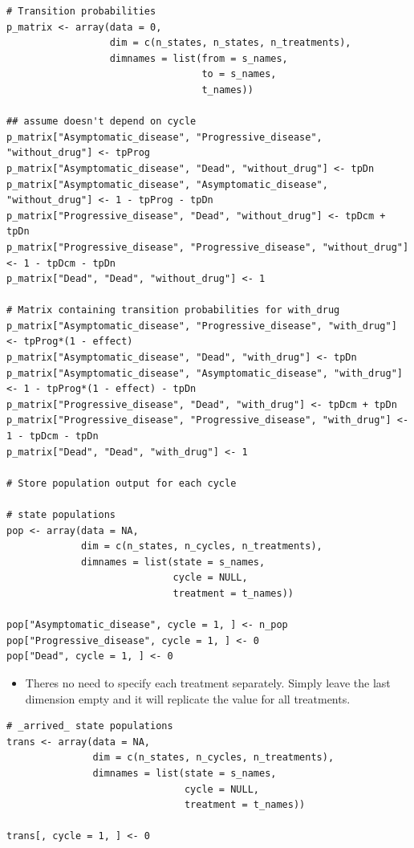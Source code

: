 \documentclass[a4paper,twoside,openany]{../svmonoBUGS}\usepackage[]{graphicx}\usepackage[]{color}
\begin{document}
\begin{verbatim}
# Transition probabilities
p_matrix <- array(data = 0,
                  dim = c(n_states, n_states, n_treatments),
                  dimnames = list(from = s_names,
                                  to = s_names,
                                  t_names))

## assume doesn't depend on cycle
p_matrix["Asymptomatic_disease", "Progressive_disease", "without_drug"] <- tpProg
p_matrix["Asymptomatic_disease", "Dead", "without_drug"] <- tpDn
p_matrix["Asymptomatic_disease", "Asymptomatic_disease", "without_drug"] <- 1 - tpProg - tpDn
p_matrix["Progressive_disease", "Dead", "without_drug"] <- tpDcm + tpDn
p_matrix["Progressive_disease", "Progressive_disease", "without_drug"] <- 1 - tpDcm - tpDn
p_matrix["Dead", "Dead", "without_drug"] <- 1

# Matrix containing transition probabilities for with_drug
p_matrix["Asymptomatic_disease", "Progressive_disease", "with_drug"] <- tpProg*(1 - effect)
p_matrix["Asymptomatic_disease", "Dead", "with_drug"] <- tpDn
p_matrix["Asymptomatic_disease", "Asymptomatic_disease", "with_drug"] <- 1 - tpProg*(1 - effect) - tpDn
p_matrix["Progressive_disease", "Dead", "with_drug"] <- tpDcm + tpDn
p_matrix["Progressive_disease", "Progressive_disease", "with_drug"] <- 1 - tpDcm - tpDn
p_matrix["Dead", "Dead", "with_drug"] <- 1

# Store population output for each cycle 

# state populations
pop <- array(data = NA,
             dim = c(n_states, n_cycles, n_treatments),
             dimnames = list(state = s_names,
                             cycle = NULL,
                             treatment = t_names))

pop["Asymptomatic_disease", cycle = 1, ] <- n_pop
pop["Progressive_disease", cycle = 1, ] <- 0
pop["Dead", cycle = 1, ] <- 0
\end{verbatim}

\begin{itemize}
\item Theres no need to specify each treatment separately. Simply leave the last dimension empty and it will replicate the value for all treatments.
\end{itemize}

\begin{verbatim}
# _arrived_ state populations
trans <- array(data = NA,
               dim = c(n_states, n_cycles, n_treatments),
               dimnames = list(state = s_names,
                               cycle = NULL,
                               treatment = t_names))

trans[, cycle = 1, ] <- 0
\end{verbatim}
\end{document}
